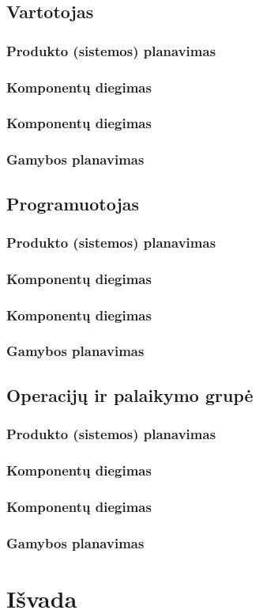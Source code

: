 \documentclass{VUMIFPSkursinis}
\begin{document}
		\subsection{Vartotojas}
			\subsubsection{Produkto (sistemos) planavimas}
			\subsubsection{Komponentų diegimas}
			\subsubsection{Komponentų diegimas}
			\subsubsection{Gamybos planavimas}
		\subsection{Programuotojas}
			\subsubsection{Produkto (sistemos) planavimas}
			\subsubsection{Komponentų diegimas}
			\subsubsection{Komponentų diegimas}
			\subsubsection{Gamybos planavimas}
		\subsection{Operacijų ir palaikymo grupė}
			\subsubsection{Produkto (sistemos) planavimas}
			\subsubsection{Komponentų diegimas}
			\subsubsection{Komponentų diegimas}
			\subsubsection{Gamybos planavimas}

	\section{Išvada}
\end{document}
